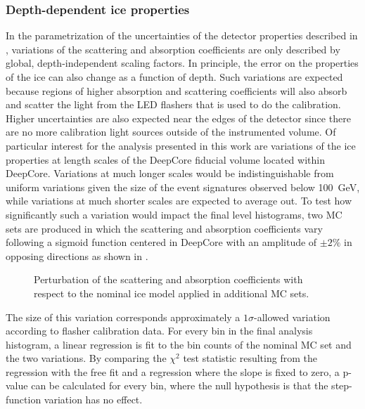 \subsubsection{Depth-dependent ice properties}
\label{sec:depth-dependent-ice-properties}

In the parametrization of the uncertainties of the detector properties described in , variations of the scattering and absorption coefficients are only described by global, depth-independent scaling factors.
In principle, the error on the properties of the ice can also change as a function of depth.
Such variations are expected because regions of higher absorption and scattering coefficients will also absorb and scatter the light from the LED flashers that is used to do the calibration.
Higher uncertainties are also expected near the edges of the detector since there are no more calibration light sources outside of the instrumented volume.
Of particular interest for the analysis presented in this work are variations of the ice properties at length scales of the DeepCore fiducial volume located within DeepCore.
Variations at much longer scales would be indistinguishable from uniform variations given the size of the event signatures observed below 100~GeV, while variations at much shorter scales are expected to average out.
To test how significantly such a variation would impact the final level histograms, two MC sets are produced in which the scattering and absorption coefficients vary following a sigmoid function centered in DeepCore with an amplitude of $\pm 2\%$ in opposing directions as shown in .
\begin{figure}
    \centering
    
    \caption{Perturbation of the scattering and absorption coefficients with respect to the nominal ice model applied in additional MC sets.}
    \label{fig:step-function-ice-model}
\end{figure}
The size of this variation corresponds approximately a $1\sigma$-allowed variation according to flasher calibration data.
For every bin in the final analysis histogram, a linear regression is fit to the bin counts of the nominal MC set and the two variations.
By comparing the $\chi^2$ test statistic resulting from the regression with the free fit and a regression where the slope is fixed to zero, a p-value can be calculated for every bin, where the null hypothesis is that the step-function variation has no effect.
